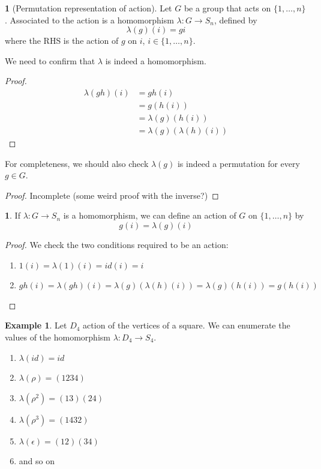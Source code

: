 \documentclass[12pt]{article}
\theoremstyle{definition}
\newtheorem{definition}{\color{NavyBlue}{\textbf{Definition}}}
\newtheorem{theorem}{\color{ForestGreen}{\textbf{Theorem}}}
\newcommand{\e}{\epsilon}
\newtheorem{example}{\color{WildStrawberry}Example}
\theoremstyle{definition}
\begin{document}
\begin{definition}[Permutation representation of action]
	Let $G$ be a group that acts on $\{1,\ldots, n\}$. Associated to the action is a homomorphism $\lambda : G \to S_n$, defined by 
	\begin{equation}
		\lambda(g)(i) = gi
	\end{equation}
	where the RHS is the action of $g$ on $i$, $i \in \{1,\ldots, n\}$.
\end{definition}
We need to confirm that $\lambda$ is indeed a homomorphism.
\begin{proof}
\begin{align*}
	\lambda(gh)(i) &= gh(i) \\
	&= g(h(i)) \tag{since action} \\
	&= \lambda(g)(h(i)) \tag{definition of $\lambda$} \\
	&= \lambda(g)(\lambda (h)(i)) \tag{definition of $\lambda$} 
\end{align*}
\end{proof}

For completeness, we should also check $\lambda(g)$ is indeed a permutation for every $g \in G$.
\begin{proof}
Incomplete (some weird proof with the inverse?)
\end{proof}

\begin{theorem}
If $\lambda : G \to S_n$ is a homomorphism, we can define an action of $G$ on $\{1,\ldots, n\}$ by
\begin{equation}
	g(i) = \lambda(g)(i)
\end{equation}
\end{theorem}
\begin{proof}
We check the two conditions required to be an action:
\begin{enumerate}
	\item $1(i) = \lambda(1)(i) = id (i) = i$
	\item $gh(i) = \lambda (gh)(i) = \lambda(g)(\lambda (h)(i)) = \lambda(g)(h(i)) = g(h(i))$
\end{enumerate}
\end{proof}

\begin{example}
	Let $D_4$ action of the vertices of a square. We can enumerate the values of the homomorphism $\lambda : D_4 \to  S_4$.
	\begin{enumerate}
		\item $\lambda(id) = id$
		\item $\lambda(\rho) = (1 2 3 4)$
		\item $\lambda(\rho^2) = (13)(24)$ 
		\item $\lambda(\rho^3) = (1 4 3 2)$
		\item $\lambda(\e) = (1 2)(34)$
		\item and so on
	\end{enumerate}
\end{example}
\end{document}
